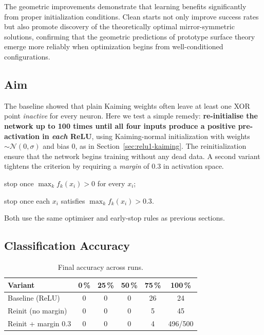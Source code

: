 The geometric improvements demonstrate that learning benefits significantly from proper initialization conditions. Clean starts not only improve success rates but also promote discovery of the theoretically optimal mirror-symmetric solutions, confirming that the geometric predictions of prototype surface theory emerge more reliably when optimization begins from well-conditioned configurations.


\subsection*{Aim}
The baseline showed that plain Kaiming weights often leave at least one
XOR point \emph{inactive} for every neuron.  
Here we test a simple remedy: \textbf{re-initialise the network up to 100 times 
until all four inputs produce a positive pre-activation in \emph{each} ReLU}, 
using Kaiming-normal initialization with weights \(\sim \mathcal{N}(0, \sigma)\) and bias \(0\), as in Section~\ref{sec:relu1-kaiming}.
The reinitialization ensure that the network begins training without any dead data.
A second variant tightens the criterion by requiring a \emph{margin}
of $0.3$ in activation space.

\begin{description}[leftmargin=2em,style=sameline]
  \item[\texttt{relu1\_reinit}]   stop once \(\max_k f_k(x_i) > 0\) for every \(x_i\);
  \item[\texttt{relu1\_reinit\_margin}] stop once each \(x_i\) satisfies
        \(\max_k f_k(x_i) > 0.3\).
\end{description}
Both use the same optimiser and early-stop rules as previous sections.

\subsection*{Classification Accuracy}

\begin{table}[ht]
\centering
\caption{Final accuracy across runs.}
\label{tab:relu1-reinit-accuracy}
\begin{tabular}{lccccc}
\toprule
Variant & 0\,\% & 25\,\% & 50\,\% & 75\,\% & 100\,\% \\
\midrule
Baseline (ReLU)       & 0 & 0 & 0 & 26 & 24 \\
Reinit (no margin)    & 0 & 0 & 0 & 5  & 45 \\
Reinit + margin 0.3   & 0 & 0 & 0 & 4  & 496/500 \\
\bottomrule
\end{tabular}
\end{table}

